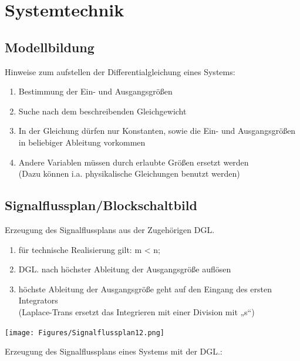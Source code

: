 \section{Systemtechnik}
\subsection{Modellbildung}
Hinweise zum aufstellen der Differentialgleichung eines Systems:
\begin{mdframed}[style=exercise]
	\begin{enumerate}
		\item Bestimmung der Ein- und Ausgangsgrößen
		\item Suche nach dem beschreibenden Gleichgewicht
		\item In der Gleichung dürfen nur Konstanten, sowie die Ein- und
		      Ausgangsgrößen in beliebiger Ableitung vorkommen
		\item Andere Variablen müssen durch erlaubte Größen ersetzt werden\\
		      \footnotesize
		      (Dazu können i.a. physikalische Gleichungen benutzt werden)
	\end{enumerate}
\end{mdframed}

\subsection{Signalflussplan/Blockschaltbild}
Erzeugung des Signalflussplans aus der Zugehörigen DGL.
\begin{mdframed}[style=exercise]
	\begin{enumerate}
		\item für technische Realisierung gilt: m < n;

		\item DGL. nach höchster Ableitung der Ausgangsgröße auflösen

		\item höchste Ableitung der Ausgangsgröße geht auf den Eingang des ersten Integrators\\
		      \footnotesize
		      (Laplace-Trans ersetzt das Integrieren mit einer Division mit „s“)
	\end{enumerate}
\end{mdframed}
\begin{center}
	\texttt{[image: Figures/Signalflussplan12.png]}
\end{center}

Erzeugung des Signalflussplans eines Systems mit der DGL.:


